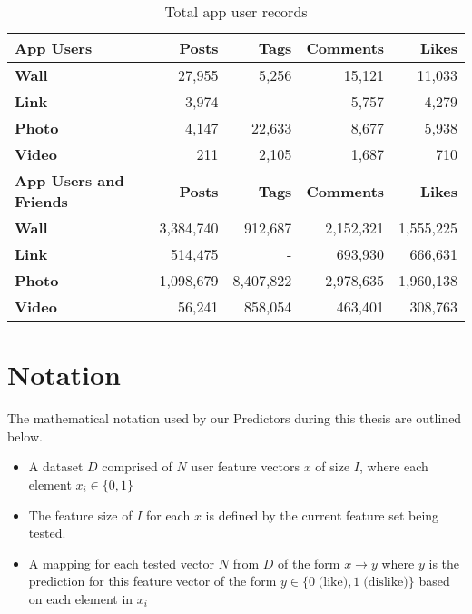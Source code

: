 \begin{table}[!htbp]
\centering
	\begin{tabular}{|l|r|r|r|r|} %
		\hline
		\textbf{App Users} & \textbf{Posts} & \textbf{Tags} & \textbf{Comments} & \textbf{Likes}  \\ \hline
		\textbf{Wall} & 27,955 & 5,256 & 15,121 & 11,033 \\ \hline
		\textbf{Link} & 3,974 & - & 5,757 & 4,279 \\ \hline
		\textbf{Photo} & 4,147 & 22,633 & 8,677 & 5,938 \\ \hline
		\textbf{Video} & 211 & 2,105 & 1,687 & 710 \\ \hline
		 \hline
		\textbf{App Users and Friends} & \textbf{Posts} & \textbf{Tags} & \textbf{Comments} & \textbf{Likes}  \\ \hline
		\textbf{Wall} & 3,384,740 & 912,687 & 2,152,321 & 1,555,225 \\ \hline
		\textbf{Link} & 514,475 & - & 693,930 & 666,631 \\ \hline
		\textbf{Photo} & 1,098,679 & 8,407,822 & 2,978,635 & 1,960,138 \\ \hline
		\textbf{Video} & 56,241 & 858,054 & 463,401 & 308,763 \\ \hline
	\end{tabular}
	\caption{Total app user records}
	\label{tab:revpol}
\end{table}

\clearpage

\section{Notation}
\label{sec:notation}

The mathematical notation used by our Predictors during this thesis are outlined below.

\begin{itemize}
\item A dataset $D$ comprised of $N$ user feature vectors $x$ of size $I$, where each element $x_i \in \{0,1\}$

\item The feature size of $I$ for each $x$ is defined by the current feature set being tested.

\item A mapping for each tested vector $N$ from $D$ of the form $x \to y$ where $y$ is the prediction for this feature vector of the form
$y \in \{0 \;\mbox{(like)},1 \;\mbox{(dislike)}\}$ based on each element in $x_i$

\end{itemize}

